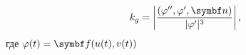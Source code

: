 \documentclass[main]{subfiles}
\begin{document}
\begin{theorem}
    \[k_g = \left|\frac{(\phi'', \phi', \vn)}{|\phi'|^3}\right|,\]
    где $\phi(t) = \vf(u(t), v(t))$
\end{theorem}

\end{document}
